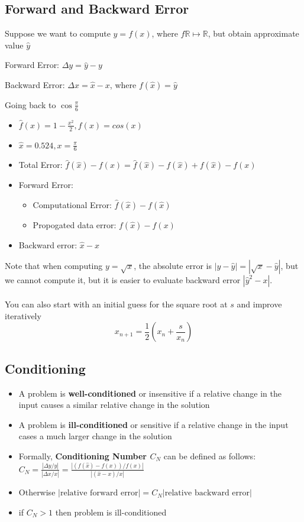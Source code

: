 \documentclass[12pt]{article}
\begin{document}
\subsection{Forward and Backward Error}

Suppose we want to compute $y = f(x)$, where $f\mathbb{R} \mapsto \mathbb{R}$, but obtain approximate value $\hat{y}$

Forward Error: $\Delta y = \hat{y} - y$

Backward Error: $\Delta x = \hat{x} - x$, where $f(\hat{x}) = \hat{y}$

Going back to $\cos \frac{\pi}{6}$
\begin{itemize}
    \item $\hat{f}(x) = 1 - \frac{x^2}{2}, f(x) = cos(x)$
    \item $\hat{x} = 0.524, x = \frac{\pi}{6}$
    \item Total Error: $\hat{f}(\hat{x}) - f(x) = \hat{f}(\hat{x}) - f(\hat{x}) + f(\hat{x}) - f(x)$
    \item Forward Error:
    \begin{itemize}
        \item Computational Error: $\hat{f}(\hat{x}) - f(\hat{x})$
        \item Propogated data error: $f(\hat{x}) - f(x)$
    \end{itemize}
    \item Backward error: $\hat{x} - x$
\end{itemize}

Note that when computing $y=\sqrt{x}$, the absolute error is $|y - \hat{y}|=|\sqrt{x} - \hat{y}|$, but we cannot compute it, but it is easier to evaluate backward error $|\hat{y}^2 - x|$.
\\
\\
You can also start with an initial guess for the square root at $s$ and improve iteratively
$$x_{n+1} = \frac{1}{2} (x_n + \frac{s}{x_n})$$

\subsection{Conditioning}
\begin{itemize}
    \item A problem is \textbf{well-conditioned} or insensitive if a relative change in the input causes a similar relative change in the solution
    \item A problem is \textbf{ill-conditioned} or sensitive if a relative change in the input cases a much larger change in the solution
    \item Formally, \textbf{Conditioning Number $C_N$} can be defined as follows: $C_N = \frac{|\Delta y/y|}{|\Delta x/x|} = \frac{|(f(\hat{x}) - f(x)) / f(x)|}{|(\hat{x} - x) / x|}$
    \item Otherwise $|\text{relative forward error}| = C_N |\text{relative backward error}|$
    \item if $C_N > 1$ then problem is ill-conditioned
\end{itemize}
\end{document}
